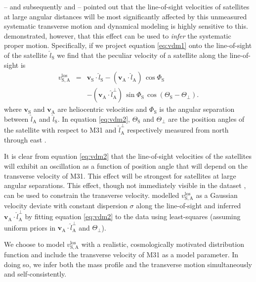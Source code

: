 \documentclass[preprint]{aastex}
\newcommand{\eqlabel}[1]{\label{eq:#1}}
\newcommand{\eq}[1]{equation \ref{eq:#1}}
\begin{document}
\citet{Bahcall:1981} -- and subsequently \citet{ew} and \citet{vdm} -- pointed
out that the line-of-sight velocities of satellites at large angular distances
will be most significantly affected by this unmeasured systematic transverse
motion and dynamical modeling is highly sensitive to this.  \citet{vdm}
demonstrated, however, that this effect can be used to \emph{infer} the
systematic proper motion.  Specifically, if we project \eq{vdm1}
onto the line-of-sight of the satellite $\hat{l}_\mathrm{S}$ we find that the
peculiar velocity of a satellite along the line-of-sight is
\begin{eqnarray}
    \eqlabel{vdm2}
    v_\mathrm{S,A}^\mathrm{los} & =& \mathbf{v}_{\mathrm{S}}
    \cdot \hat{l}_\mathrm{S} - (\mathbf{v}_{\mathrm{A}}
    \cdot \hat{l}_\mathrm{A}) \, \cos \Phi_\mathrm{S} \nonumber \\ &&
    - (\mathbf{v}_{\mathrm{A}} \cdot \hat{l}_\mathrm{A}^\perp) \,
    \sin \Phi_\mathrm{S} \, \cos \left ( \Theta_\mathrm{S} - \Theta_\perp \right ).
\end{eqnarray}
where $\mathbf{v}_{\mathrm{S}}$ and $\mathbf{v}_{\mathrm{A}}$ are heliocentric
velocities and $\Phi_\mathrm{S}$ is the angular separation between
$\hat{l}_\mathrm{A}$ and $\hat{l}_\mathrm{S}$.  In \eq{vdm2},
$\Theta_\mathrm{S}$ and $\Theta_\perp$ are the position angles of the satellite
with respect to M31 and $\hat{l}_\mathrm{A}^\perp$ respectively measured from
north through east \citep[][their equation 3]{vdm}.

It is clear from \eq{vdm2} that the line-of-sight velocities of
the satellites will exhibit an oscillation as a function of position angle that
will depend on the transverse velocity of M31.  This effect will be strongest
for satellites at large angular separations.  This effect, though not immediately
visible in the dataset \citep[e.g.~figure 1 of][]{vdm}, can be used to constrain
the transverse velocity.  \citet{vdm} modelled $v_\mathrm{S,A}^\mathrm{los}$ as
a Gaussian velocity deviate with constant dispersion $\sigma$ along the line-of-sight
and inferred $\mathbf{v}_{\mathrm{A}} \cdot \hat{l}_\mathrm{A}^\perp$ by fitting
\eq{vdm2} to the data using least-squares (assuming uniform priors
in $\mathbf{v}_{\mathrm{A}} \cdot \hat{l}_\mathrm{A}^\perp$ and $\Theta_\perp$).

We choose to model $v_\mathrm{S,A}^\mathrm{los}$ with a realistic, cosmologically
motivated distribution function and include the transverse velocity of M31 as
a model parameter.  In doing so, we infer both the mass profile and the
transverse motion simultaneously and self-consistently.
\end{document}
